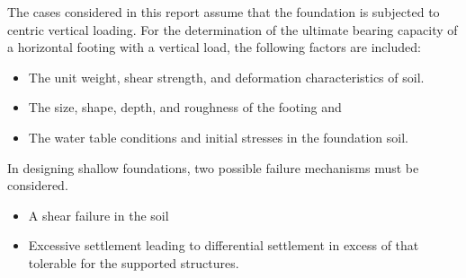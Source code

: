The cases considered in this report assume that the foundation is subjected to centric vertical loading. For the determination of the ultimate bearing capacity of a horizontal footing with a vertical load, the following factors are included: \cite{dunn_fundamentals_1980}
\begin{itemize}
\item The unit weight, shear strength, and deformation characteristics of soil.
\item The size, shape, depth, and roughness of the footing and
\item The water table conditions and initial stresses in the foundation soil.
\end{itemize}

In designing shallow foundations, two possible failure mechanisms must be considered. \cite{dunn_fundamentals_1980}
\begin{itemize}
  \item A shear failure in the soil
  \item Excessive settlement leading to differential settlement in excess of that tolerable for the supported structures.
\end{itemize}

